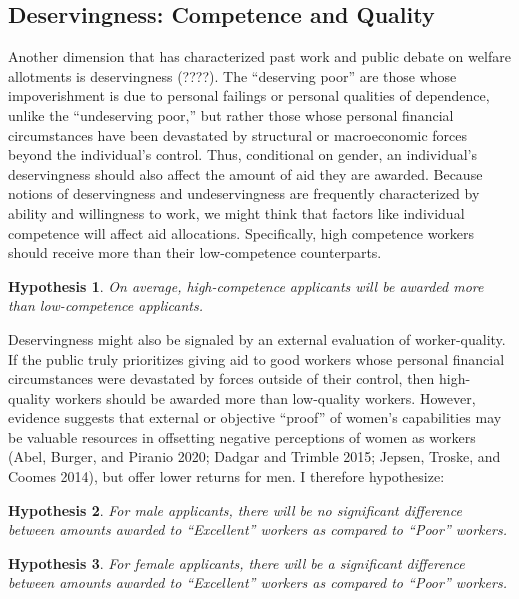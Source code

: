 \documentclass[12pt]{article}%
\newtheorem{hypothesis}{Hypothesis}
\begin{document}
\begin{doublespace}
\subsection{Deservingness: Competence and Quality}
Another dimension that has characterized past work and public debate on welfare allotments is deservingness (????). The “deserving poor” are those whose impoverishment is due to personal failings or personal qualities of dependence, unlike the “undeserving poor,” but rather those whose personal financial circumstances have been devastated by structural or macroeconomic forces beyond the individual’s control. Thus, conditional on gender, an individual’s deservingness should also affect the amount of aid they are awarded. Because notions of deservingness and undeservingness are frequently characterized by ability and willingness to work, we might think that factors like individual competence will affect aid allocations. Specifically, high competence workers should receive more than their low-competence counterparts.


\begin{hypothesis} \label{hyp:second}
On average, high-competence applicants will be awarded more than low-competence applicants.
\end{hypothesis}


Deservingness might also be signaled by an external evaluation of worker-quality. If the public truly prioritizes giving aid to good workers whose personal financial circumstances were devastated by forces outside of their control, then high-quality workers should be awarded more than low-quality workers. However, evidence suggests that external or objective ``proof” of women’s capabilities may be valuable resources in offsetting negative perceptions of women as workers (Abel, Burger, and Piranio 2020; Dadgar and Trimble 2015; Jepsen, Troske, and Coomes 2014), but offer lower returns for men. I therefore hypothesize:


\begin{hypothesis} \label{hyp:thirda}
	For male applicants, there will be no significant difference between amounts awarded to ``Excellent” workers as compared to ``Poor” workers.
\end{hypothesis}

\begin{hypothesis} \label{hyp:thirdb}
	For female applicants, there will be a significant difference between amounts awarded to ``Excellent” workers as compared to ``Poor” workers.
\end{hypothesis}



\end{doublespace}
\end{document}
